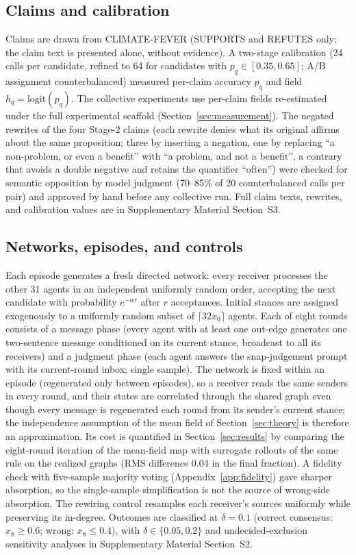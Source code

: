 \documentclass{ieeeaccess}
\begin{document}
\subsection{Claims and calibration}

Claims are drawn from CLIMATE-FEVER \cite{Diggelmann2020} (SUPPORTS and
REFUTES only; the claim text is presented alone, without evidence). A
two-stage calibration (24 calls per candidate, refined to 64 for candidates
with $p_q \in [0.35, 0.65]$; A/B assignment counterbalanced) measured
per-claim accuracy $p_q$ and field $h_q = \mathrm{logit}(p_q)$. The collective
experiments use per-claim fields re-estimated under the full experimental
scaffold (Section~\ref{sec:measurement}). The negated rewrites of the four
Stage-2 claims (each rewrite denies what its original affirms about the
same proposition; three by inserting a negation, one by replacing ``a non-problem, or even a
benefit'' with ``a problem, and not a benefit'', a contrary that avoids a
double negative and retains the quantifier ``often'') were checked for
semantic opposition by model judgment
(70--85\% of 20 counterbalanced calls per pair) and approved by hand before
any collective run. Full claim texts, rewrites, and calibration values are in Supplementary Material Section~S3.

\subsection{Networks, episodes, and controls}

Each episode generates a fresh directed network: every receiver processes the
other 31 agents in an independent uniformly random order, accepting the next
candidate with probability $e^{-\alpha r}$ after $r$ acceptances. Initial
stances are assigned exogenously to a uniformly random subset of
$\lceil 32 x_0 \rceil$ agents. Each of eight rounds consists of a message
phase (every agent with at least one out-edge generates one two-sentence
message conditioned on its current stance, broadcast to all its receivers)
and a judgment phase (each agent answers the snap-judgement prompt with its
current-round inbox; single sample). The network is fixed within an episode
(regenerated only between episodes), so a receiver reads the same senders in
every round, and their states are correlated through the shared graph even
though every message is regenerated each round from its sender's current
stance; the independence assumption of the mean field of
Section~\ref{sec:theory} is therefore an approximation. Its cost is
quantified in Section~\ref{sec:results} by comparing the eight-round
iteration of the mean-field map with surrogate rollouts of the same rule on
the realized graphs (RMS difference 0.04 in the final fraction). A fidelity check with five-sample majority voting (Appendix~\ref{app:fidelity}) gave
sharper absorption, so the single-sample simplification is not the source
of wrong-side absorption. The rewiring control resamples each receiver's sources uniformly
while preserving its in-degree. Outcomes are classified at $\delta = 0.1$
(correct consensus: $x_8 \ge 0.6$; wrong: $x_8 \le 0.4$), with
$\delta \in \{0.05, 0.2\}$ and undecided-exclusion sensitivity analyses in Supplementary Material Section~S2.
\end{document}
